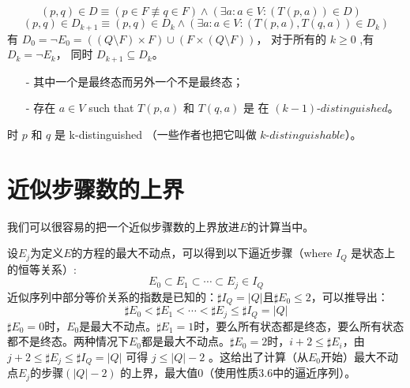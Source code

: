  \\
\mbox{　　　}$ (p,q)\in D \equiv (p \in F \not\equiv q \in F) \land (\exists a:a \in V : (T(p,a)) \in D) $\\

$$ (p,q) \in D_{k+1} \equiv (p,q) \in D_k \land ( \exists a:a \in V : (T (p,a),T(q,a))\in D_k)$$
有 $D_0 = \neg E_0 = ( (Q \setminus F) \times F) \cup ( F \times ( Q \setminus F))$， 对于所有的 $k \ge 0$ ,有 $D_k = \neg E_k$， 同时 $D_{k+1} \subseteq D_k $。
\newline

\noindent{\textbf{注释3.12}： 对于 $E_k$，有一个直观的 $D_k$ 的说明是有用的。%
当且仅当没有字符串 $ w: |w| \leq k $ 满足 $ w \in \overrightarrow{\mathcal{L}}(p) \not\equiv w \in \overrightarrow{\mathcal{L}}(q) $一个状态对 $p,q$ 也可以说成 $k$-$distinguished$ (写作 $(p,q)\in E_k$) 。作为结果，当且仅当}

\begin{itemize}
    \item [-] 其中一个是最终态而另外一个不是最终态；
    \item [-] 存在 $a\in V$ such that $T(p,a)$ 和 $T(q,a)$ 是 在 $(k-1)$-$distinguished$。
\end{itemize}
时 $p$ 和 $q$ 是 k-distinguished （一些作者也把它叫做 $k$-$distinguishable$）。

\section{近似步骤数的上界}
我们可以很容易的把一个近似步骤数的上界放进$E$的计算当中。

设$E_j$为定义$E$的方程的最大不动点，可以得到以下逼近步骤（where $I_Q$ 是状态上的恒等关系）:
\[  E_0 \subset E_1 \subset \cdots \subset E_j \in I_Q \]
近似序列中部分等价关系的指数是已知的：$\sharp I_Q = |Q| \mbox{且} \sharp E_0 \leq 2$，可以推导出：
\[ \sharp E_0 < \sharp E_1 < \cdots < \sharp E_j \leq \sharp I_Q = |Q| \]
$\sharp E_0=0$时，$E_0$是最大不动点。$\sharp E_1=1$时，要么所有状态都是终态，要么所有状态都不是终态。两种情况下$E_0$都是最大不动点。$\sharp E_0=2$时，$i+2 \leq \sharp E_i$，由 $ j+2 \leq \sharp E_j \leq \sharp I_Q = |Q| $ 可得 $j \leq |Q|-2 $ 。这给出了计算（从$E_0$开始）最大不动点$E_j$的步骤$(|Q|-2)$ 的上界，最大值0（使用性质3.6中的逼近序列）。

